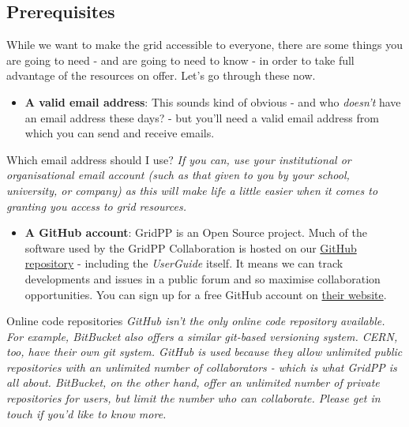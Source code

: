 \subsection{Prerequisites}
\label{sec:prerequisites}
While we want to make the grid accessible to everyone, there are some
things you are going to need - and are going to need to know - in order
to take full advantage of the resources on offer. Let's go through these
now.

\begin{itemize}
\tightlist
\item
  \textbf{A valid email address}: This sounds kind of obvious - and who
  \emph{doesn't} have an email address these days? - but you'll need a
  valid email address from which you can send and receive emails.
\end{itemize}

\begin{hintbox}{Which email address should I use?}
\emph{If you can, use your institutional or organisational email account (such
as that given to you by your school, university, or company) as this
will make life a little easier when it comes to granting you access to
grid resources.}
\end{hintbox}

\begin{itemize}
\tightlist
\item
  \textbf{A GitHub account}: GridPP is an Open Source project. Much of
  the software used by the GridPP Collaboration is hosted on our
  \href{http://github.com/gridpp}{GitHub repository} - including the
  \emph{UserGuide} itself. It means we can track developments and issues
  in a public forum and so maximise collaboration opportunities. You can
  sign up for a free GitHub account on \href{http://github.com}{their
  website}.
\end{itemize}

\begin{infobox}{Online code repositories}
\emph{GitHub isn't the only online code repository available. For example,
BitBucket also offers a similar git-based versioning system. CERN, too,
have their own git system. GitHub is used because they allow unlimited
public repositories with an unlimited number of collaborators - which is
what GridPP is all about. BitBucket, on the other hand, offer an
unlimited number of private repositories for users, but limit the number
who can collaborate. Please get in touch if you'd like to know more.}
\end{infobox}

